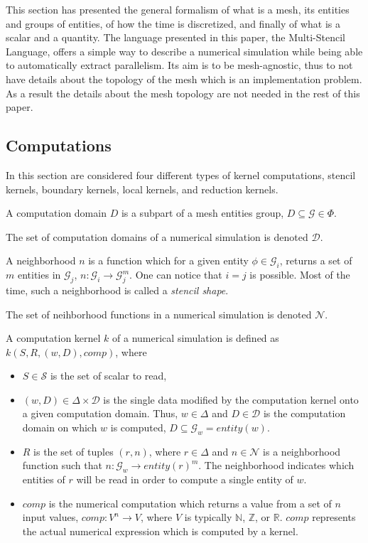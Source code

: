 This section has presented the general formalism of what is a mesh, its entities and groups of entities, of how the time is discretized, and finally of what is a scalar and a quantity.
The language presented in this paper, the Multi-Stencil Language, offers a simple way to describe a numerical simulation while being able to automatically extract parallelism.
Its aim is to be mesh-agnostic, thus to not have details about the topology of the mesh which is an implementation problem.
As a result the details about the mesh topology are not needed in the rest of this paper.

\subsection{Computations}

In this section are considered four different types of kernel computations, stencil kernels, boundary kernels, local kernels, and reduction kernels. 

\medskip
\begin{mydefs}
\item A computation domain $D$ is a subpart of a mesh entities group, $D \subseteq \mathcal{G} \in \Phi$.
\item The set of computation domains of a numerical simulation is denoted $\mathcal{D}$.
\item A neighborhood $n$ is a function which for a given entity $\phi \in \mathcal{G}_i$, returns a set of $m$ entities in $\mathcal{G}_j$, $n : \mathcal{G}_i \rightarrow \mathcal{G}_j^m$. One can notice that $i = j$ is possible. Most of the time, such a neighborhood is called a \emph{stencil shape}.
\item The set of neihborhood functions in a numerical simulation is denoted $\mathcal{N}$.
\end{mydefs}

\begin{mydef}
A computation kernel $k$ of a numerical simulation is defined as $k(S,R,(w,D),comp)$, where 
\begin{itemize}
\item $S \in \mathcal{S}$ is the set of scalar to read, 
\item $(w,D) \in \Delta \times \mathcal{D}$ is the single data modified by the computation kernel onto a given computation domain. Thus, $w \in \Delta$ and $D \in \mathcal{D}$ is the computation domain on which $w$ is computed, $D \subseteq \mathcal{G}_w=entity(w)$.
\item $R$ is the set of tuples $(r,n)$, where $r \in \Delta$ and $n \in \mathcal{N}$ is a neighborhood function such that $n : \mathcal{G}_w \rightarrow entity(r)^m$. The neighborhood indicates which entities of $r$ will be read in order to compute a single entity of $w$. 
\item $comp$ is the numerical computation which returns a value from a set of $n$ input values, $comp: V^n \rightarrow V$, where $V$ is typically $\mathbb{N}$, $\mathbb{Z}$, or $\mathbb{R}$. $comp$ represents the actual numerical expression which is computed by a kernel.
\end{itemize}
\end{mydef}

